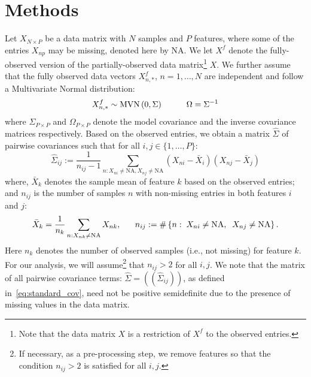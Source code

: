 \section{Methods}\label{sec:methods-materials}

Let $X_{N \times P}$ be a data matrix with $N$ samples and $P$ features, where some of the entries $X_{np}$ may be missing, denoted here by $\text{NA}$. 
We let $X^f$ denote the fully-observed version of the partially-observed data matrix\footnote{Note that the data matrix $X$ is a restriction of $X^f$ to the observed entries.} $X$.
We further assume that the fully observed data vectors $X^f_{n,*}$, $n=1, \ldots, N$ are independent and follow a Multivariate Normal distribution:
\begin{equation}\label{eq:normal_dist}
    X^f_{n,*} \sim \text{MVN} \left ( 0, \Sigma \right ) \hspace{1 cm} \Omega = \Sigma^{-1}
\end{equation}
where $\Sigma_{P \times P}$ and $\Omega_{P \times P}$ denote the model covariance and the inverse covariance matrices respectively. 
Based on the observed entries, we obtain a matrix $\hat{\Sigma}$ of pairwise covariances such that for all $i, j \in \{1, \ldots, P\}$:
\begin{equation}\label{eq:standard_cov}
   \hat{\Sigma}_{ij} := \frac{1}{n_{ij} - 1} \sum_{n: X_{ni} \neq \text{NA}, X_{nj} \neq \text{NA}} (X_{ni} - \bar{X}_{i})(X_{nj} - \bar{X}_{j})
\end{equation}
where, $\bar{X}_{k}$ denotes the sample mean of feature $k$ based on the observed entries; and $n_{ij}$ is the number of samples $n$ with non-missing entries in both features $i$ and $j$: 
\begin{equation}\label{eq:missing_n}
\bar{X}_{k} = \frac{1}{n_{k}} \sum_{n: X_{nk} \neq \text{NA}} X_{nk},~~~~~n_{ij} : = \# \left \{n: \; X_{ni} \neq \text{\text{NA}},  \;\; X_{nj} \neq \text{\text{NA}} \right \}.
\end{equation}
Here $n_k$ denotes the number of observed samples (i.e., not missing) for feature $k$. For our analysis, we will assume\footnote{If necessary, as a pre-processing step, we remove features so that the condition $n_{ij}>2$ is satisfied for all $i,j$.} that $n_{ij}>2$ for all $i,j$.
We note that the matrix of all pairwise covariance terms: $\hat{\Sigma} = ((\hat{\Sigma}_{ij}))$, as defined in~\eqref{eq:standard_cov}, need not be positive semidefinite due to the presence of missing values in the data matrix.

